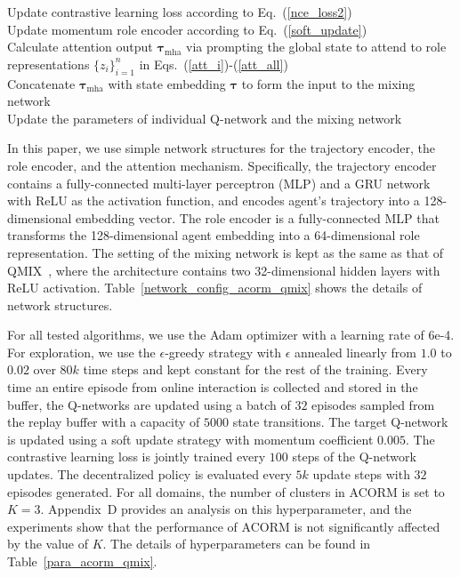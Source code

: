 \documentclass{article} %
\begin{document}
\begin{algorithm}[!h]
{{
Update contrastive learning loss according to Eq.~(\ref{nce_loss2}) \\
Update momentum role encoder according to Eq.~(\ref{soft_update}) \\
}
Calculate attention output $\bm{\tau}_{\text{mha}}$ via prompting the global state to attend to role representations $\{z_i\}_{i=1}^n$ in Eqs.~(\ref{att_i})-(\ref{att_all}) \\
Concatenate $\bm{\tau}_{\text{mha}}$ with state embedding $\bm{\tau}$ to form the input to the mixing network \\
Update the parameters of individual Q-network and the mixing network \\
}     
\end{algorithm}





\clearpage
In this paper, we use simple network structures for the trajectory encoder, the role encoder, and the attention mechanism. 
Specifically, the trajectory encoder contains a fully-connected multi-layer perceptron (MLP) and a GRU network with ReLU as the activation function, and encodes agent's trajectory into a 128-dimensional embedding vector.
The role encoder is a fully-connected MLP that transforms the 128-dimensional agent embedding into a 64-dimensional role representation.
The setting of the mixing network is kept as the same as that of QMIX~\citep{rashid2020monotonic}, where the architecture contains two 32-dimensional hidden layers with ReLU activation.
Table~\ref{network_config_acorm_qmix} shows the details of network structures.

For all tested algorithms, we use the Adam optimizer with a learning rate of 6e-4. 
For exploration, we use the $\epsilon$-greedy strategy with $\epsilon$ annealed linearly from $1.0$ to $0.02$ over $80k$ time steps and kept constant for the rest of the training. 
Every time an entire episode from online interaction is collected and stored in the buffer, the Q-networks are updated using a batch of $32$ episodes sampled from the replay buffer with a capacity of $5000$ state transitions.
The target Q-network is updated using a soft update strategy with momentum coefficient $0.005$.
The contrastive learning loss is jointly trained every $100$ steps of the Q-network updates.
The decentralized policy is evaluated every $5k$ update steps with $32$ episodes generated. 
For all domains, the number of clusters in ACORM is set to $K=3$. 
Appendix~D provides an analysis on this hyperparameter, and the experiments show that the performance of ACORM is not significantly affected by the value of $K$.
The details of hyperparameters can be found in Table~\ref{para_acorm_qmix}.
\end{document}
